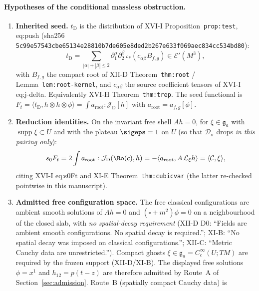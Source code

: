 \paragraph{Hypotheses of the conditional massless obstruction.}
\label{hyp:massless}
\begin{enumerate}
\item[\textbf{(H1)}]\label{H:tD}\textbf{Inherited seed.}
  $t_{\mathrm D}$ is the distribution of XVI-I Proposition~\texttt{prop:test}, eq:push
  (sha256 \texttt{5c99e57543cbe65134e28810b7de605e8ded2b267e633f069aec834cc534bd80}):
  \[
  t_{\mathrm D}
  =\sum_{|\alpha|+|\beta|\le 2}
  \partial_1^\alpha\partial_2^\beta\,\iota_*(c_{\alpha\beta}B_{f,g})
  \in\mathcal E'(M^3),
  \]
  with $B_{f,g}$ the compact root of XII-D Theorem~\texttt{thm:root} /
  Lemma~\texttt{lem:root-kernel}, and $c_{\alpha\beta}$ the source coefficient
  tensors of XVI-I eq:j-delta. Equivalently XVI-H Theorem~\texttt{thm:trep}.
  The seed functional is
  $F_t=\langle t_{\mathrm D},h\otimes h\otimes\phi\rangle=\int a_{\mathrm{root}}:
  \mathcal J_{\mathrm D}[h]$ with $a_{\mathrm{root}}=a_{f,g}[\phi]$.
\item[\textbf{(H2)}]\label{H:reduction}\textbf{Reduction identities.}
  On the invariant free shell $Ah=0$, for $\xi\in\mathfrak g_a$ with
  $\operatorname{supp}\xi\subset U$ and with the plateau $\sigeps=1$ on $U$
  (so that $\mathcal D_\sigma$ drops \emph{in this pairing only}):
  \[
  s_0F_t
  =2\int a_{\mathrm{root}}:\mathcal J_{\mathrm D}(\Ro(c),h)
  =-\langle a_{\mathrm{root}},A\,\mathcal L_\xi h\rangle
  =\langle\mathcal C,\xi\rangle,
  \]
  citing XVI-I eq:s0Ft and XI-E Theorem~\texttt{thm:cubicvar}
  (the latter re-checked pointwise in this manuscript).
\item[\textbf{(H3)}]\label{H:config}\textbf{Admitted free configuration space.}
  The free classical configurations are ambient smooth solutions of
  $Ah=0$ and $(\square+m^2)\phi=0$ on a neighbourhood of the closed slab,
  with \emph{no spatial-decay requirement} (XII-D D0:
  ``Fields are ambient smooth configurations. No spatial decay is required.'';
  XI-B: ``No spatial decay was imposed on classical configurations.'';
  XII-C: ``Metric Cauchy data are unrestricted.'').
  Compact ghosts $\xi\in\mathfrak g_a=C_c^\infty(U;TM)$ are required by the frozen
  support (XII-D/XI-B). The displayed free solutions $\phi=x^1$ and
  $h_{12}=p(t-z)$ are therefore admitted by Route~A of
  Section~\ref{sec:admission}. Route~B (spatially compact Cauchy data) is

\end{enumerate}
